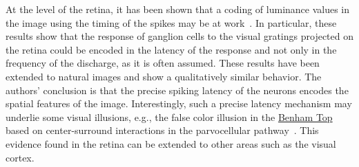 \documentclass[brainsci, %
               review,submit,pdftex,moreauthors
               ]{Definitions/mdpi}
\begin{document}
 At the level of the retina, it has been shown that a coding of luminance values in the image using the timing of the spikes may be at work~\citep{gollisch_rapid_2008}. In particular, these results show that the response of ganglion cells to the visual gratings projected on the retina could be encoded in the latency of the response and not only in the frequency of the discharge, as it is often assumed. These results have been extended to natural images and show a qualitatively similar behavior. The authors' conclusion is that the precise spiking latency of the neurons encodes the spatial features of the image. Interestingly, such a precise latency mechanism may underlie some visual illusions, e.g., the false color illusion in the \href{https://michaelbach.de/ot/col-Benham/index.html}{Benham Top} based on center-surround interactions in the parvocellular pathway~\citep{kenyon_theory_2004}. This evidence found in the retina can be extended to other areas such as the visual cortex.
\end{document}
